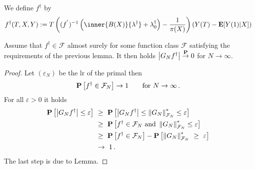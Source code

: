 We define $f^\dagger$ by
\begin{gather}
  f^\dagger(T,X,Y)
  :=
  T
  \left( 
    (f^{'})^{-1}
    \left( 
      \inner
      {B(X)}
      {\lambda^\dagger}
    +
    \lambda_0^\dagger
    \right)
    -
    \frac{1}{\pi(X)}
  \right)
  \left( 
    Y(T)
    -
    \E
    [
    Y(1)|X
    ]
  \right)
\end{gather}
\begin{lemma}
  Assume that 
  $f^\dagger \in \mathcal{F}$ almost surely 
  for some function class $\mathcal{F}$ satisfying the requirements 
  of the previous lemma. It then holds
  $
  \left| G_Nf^\dagger \right|
  \overset{\P}{\to}0$ for 
  $N\to\infty$.
\end{lemma}
\begin{proof}
  Let $(\varepsilon_N)$ be the lr of the primal
  then
  \begin{gather}
    \P
    \left[ 
      f^\dagger
      \in
      \mathcal{F}_N
    \right]
    \to 1
    \qquad
    \text{for}\ 
    N\to\infty
    \,.
  \end{gather}
  For all $\varepsilon>0$ it holds
  \begin{align*}
    \P
    \left[ 
  \left| G_Nf^\dagger \right|
  \le
  \varepsilon
    \right]
    &
    \ 
    \ge
    \ 
    \P
    \left[ 
  \left| G_Nf^\dagger \right|
  \le
  \norm{G_N}^*_{\mathcal{F}_N}
  \le
  \varepsilon
    \right]
    \\
    &
    \ 
    \ge
    \ 
    \P
    \left[ 
      f^\dagger\in\mathcal{F}_N
      \ 
      \text{and}\ 
  \norm{G_N}^*_{\mathcal{F}_N}
  \le
  \varepsilon
    \right]
    \\
    &
    \ 
    \ge
    \ 
    \P
    \left[ 
      f^\dagger\in\mathcal{F}_N
    \right]
    -
    \P
    \left[ 
  \norm{G_N}^*_{\mathcal{F}_N}
    \ 
  \ge
    \ 
  \varepsilon
    \right]
    \\
    &
    \ 
    \to
    \ 
    1
    \,.
  \end{align*}
  The last step is due to Lemma.
\end{proof}

